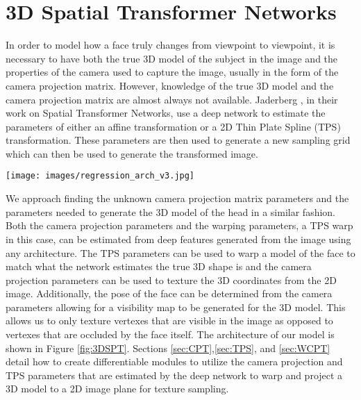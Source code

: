 \documentclass[10pt,twocolumn,letterpaper]{article}
\begin{document}
\section{3D Spatial Transformer Networks}
In order to model how a face truly changes from viewpoint to viewpoint, it is necessary to have both the true 3D model of the subject in the image and the properties of the camera used to capture the image, usually in the form of the camera projection matrix. However, knowledge of the true 3D model and the camera projection matrix are almost always not available. Jaderberg \etal \cite{Jaderberg15}, in their work on Spatial Transformer Networks, use a deep network to estimate the parameters of either an affine transformation or a 2D Thin Plate Spline (TPS) transformation. These parameters are then used to generate a new sampling grid which can then be used to generate the transformed image.

\begin{figure*}[t!]
\centering
\texttt{[image: images/regression\_arch\_v3.jpg]}
\caption{Network design of the 3D TPS Spatial Transformer for facial alignment. Because a 3D model and an estimate of the camera position are found in the output of the network, visibility of landmarks can also be determined. Visible landmarks are shown in green while non-visible landmarks are shown in blue.}
\label{fig:3DSPT}
\end{figure*}

We approach finding the unknown camera projection matrix parameters and the parameters needed to generate the 3D model of the head in a similar fashion. Both the camera projection parameters and the warping parameters, a TPS warp in this case, can be estimated from deep features generated from the image using any architecture. The TPS parameters can be used to warp a model of the face to match what the network estimates the true 3D shape is and the camera projection parameters can be used to texture the 3D coordinates from the 2D image. Additionally, the pose of the face can be determined from the camera parameters allowing for a visibility map to be generated for the 3D model. This allows us to only texture vertexes that are visible in the image as opposed to vertexes that are occluded by the face itself. The architecture of our model is shown in Figure \ref{fig:3DSPT}. Sections \ref{sec:CPT},\ref{sec:TPS}, and \ref{sec:WCPT} detail how to create differentiable modules to utilize the camera projection and TPS parameters that are estimated by the deep network to warp and project a 3D model to a 2D image plane for texture sampling.
\end{document}

